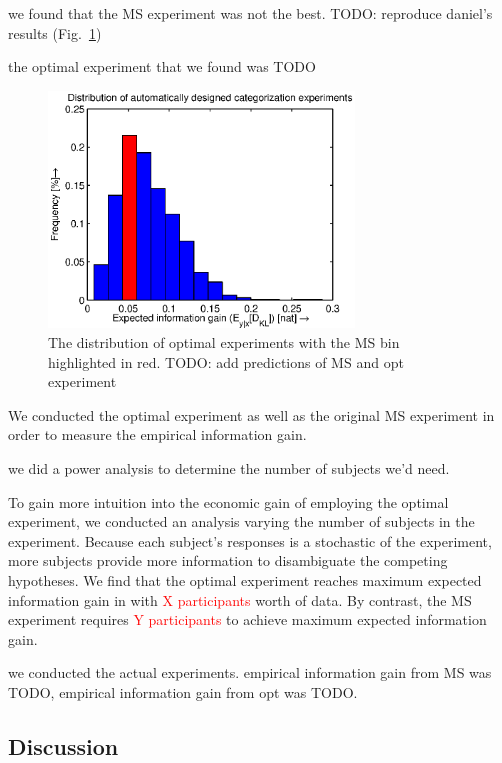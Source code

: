 \documentclass{article}
\newcommand{\red}[1]{\textcolor{Red}{#1}}
\newcommand{\cas}[1]{ \textsf{\color{darkgray} \scriptsize #1} }
\begin{document}
\cas{we found that the MS experiment was not the best. TODO: reproduce daniel's results (Fig.~\ref{fig:dist})}

\cas{the optimal experiment that we found was TODO}

\begin{figure}[h!]
\centering
\includegraphics[width=3.2in]{img/dist.eps}
\caption{The distribution of optimal experiments with the MS bin highlighted in red. TODO: add predictions of MS and opt experiment}
\label{fig:dist}
\end{figure}



We conducted the optimal experiment as well as the original MS experiment in order to measure the empirical information gain.

\cas{we did a power analysis to determine the number of subjects we'd need.}

To gain more intuition into the economic gain of employing the optimal experiment, we conducted an analysis varying the number of subjects in the experiment. Because each subject's responses is a stochastic of the experiment, more subjects provide more information to disambiguate the competing hypotheses. We find that the optimal experiment reaches maximum expected information gain in with \red{X participants} worth of data. By contrast, the MS experiment requires \red{Y participants} to achieve maximum expected information gain.


\cas{we conducted the actual experiments. empirical information gain from MS was TODO, empirical information gain from opt was TODO.}

\subsection{Discussion}
\end{document}
